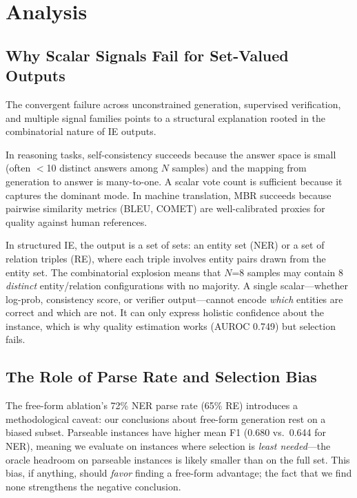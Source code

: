 \documentclass[11pt,a4paper]{article}
\begin{document}
\section{Analysis}

\subsection{Why Scalar Signals Fail for Set-Valued Outputs}

The convergent failure across unconstrained generation, supervised verification, and multiple signal families points to a structural explanation rooted in the combinatorial nature of IE outputs.

In reasoning tasks, self-consistency succeeds because the answer space is small (often $<$10 distinct answers among $N$ samples) and the mapping from generation to answer is many-to-one. A scalar vote count is sufficient because it captures the dominant mode. In machine translation, MBR succeeds because pairwise similarity metrics (BLEU, COMET) are well-calibrated proxies for quality against human references.

In structured IE, the output is a set of sets: an entity set (NER) or a set of relation triples (RE), where each triple involves entity pairs drawn from the entity set. The combinatorial explosion means that $N$=8 samples may contain 8 \emph{distinct} entity/relation configurations with no majority. A single scalar---whether log-prob, consistency score, or verifier output---cannot encode \emph{which} entities are correct and which are not. It can only express holistic confidence about the instance, which is why quality estimation works (AUROC 0.749) but selection fails.

\subsection{The Role of Parse Rate and Selection Bias}

The free-form ablation's 72\% NER parse rate (65\% RE) introduces a methodological caveat: our conclusions about free-form generation rest on a biased subset. Parseable instances have higher mean F1 (0.680 vs.\ 0.644 for NER), meaning we evaluate on instances where selection is \emph{least needed}---the oracle headroom on parseable instances is likely smaller than on the full set. This bias, if anything, should \emph{favor} finding a free-form advantage; the fact that we find none strengthens the negative conclusion.
\end{document}
